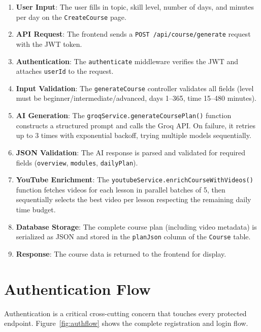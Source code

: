\documentclass[12pt,a4paper]{report}
\begin{document}
\begin{enumerate}[noitemsep]
    \item \textbf{User Input}: The user fills in topic, skill level, number of days, and minutes per day on the \texttt{CreateCourse} page.
    \item \textbf{API Request}: The frontend sends a \texttt{POST /api/course/generate} request with the JWT token.
    \item \textbf{Authentication}: The \texttt{authenticate} middleware verifies the JWT and attaches \texttt{userId} to the request.
    \item \textbf{Input Validation}: The \texttt{generateCourse} controller validates all fields (level must be beginner/intermediate/advanced, days 1--365, time 15--480 minutes).
    \item \textbf{AI Generation}: The \texttt{groqService.generateCoursePlan()} function constructs a structured prompt and calls the Groq API. On failure, it retries up to 3 times with exponential backoff, trying multiple models sequentially.
    \item \textbf{JSON Validation}: The AI response is parsed and validated for required fields (\texttt{overview}, \texttt{modules}, \texttt{dailyPlan}).
    \item \textbf{YouTube Enrichment}: The \texttt{youtubeService.enrichCourseWithVideos()} function fetches videos for each lesson in parallel batches of 5, then sequentially selects the best video per lesson respecting the remaining daily time budget.
    \item \textbf{Database Storage}: The complete course plan (including video metadata) is serialized as JSON and stored in the \texttt{planJson} column of the \texttt{Course} table.
    \item \textbf{Response}: The course data is returned to the frontend for display.
\end{enumerate}

\section{Authentication Flow}

Authentication is a critical cross-cutting concern that touches every protected endpoint. Figure~\ref{fig:authflow} shows the complete registration and login flow.
\end{document}
